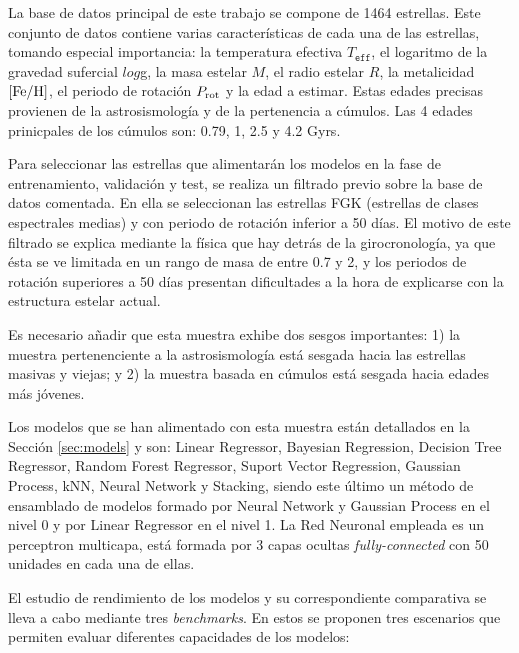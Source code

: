 \vspace{0.5cm}
La base de datos principal de este trabajo se compone de 1464 estrellas. Este conjunto de datos contiene varias características de cada una de las estrellas, tomando especial importancia: la temperatura efectiva $T_\texttt{eff}$, el logaritmo de la gravedad sufercial $log$g, la masa estelar $M$, el radio estelar $R$, la metalicidad ${\rm [Fe/H]}$, el periodo de rotación $P_{\rm rot}$ y la edad a estimar. Estas edades precisas provienen de la astrosismología y de la pertenencia a cúmulos. Las 4 edades prinicpales de los cúmulos son: 0.79, 1, 2.5 y 4.2 Gyrs.

Para seleccionar las estrellas que alimentarán los modelos en la fase de entrenamiento, validación y test, se realiza un filtrado previo sobre la base de datos comentada. En ella se seleccionan las estrellas FGK (estrellas de clases espectrales medias) y con periodo de rotación inferior a 50 días. El motivo de este filtrado se explica mediante la física que hay detrás de la girocronología, ya que ésta se ve limitada en un rango de masa de entre 0.7 y 2, y los periodos de rotación superiores a 50 días presentan dificultades a la hora de explicarse con la estructura estelar actual.

Es necesario añadir que esta muestra exhibe dos sesgos importantes: 1) la muestra pertenenciente a la astrosismología está sesgada hacia las estrellas masivas y viejas; y 2) la muestra basada en cúmulos está sesgada hacia edades más jóvenes.

\vspace{0.5cm}

Los modelos que se han alimentado con esta muestra están detallados en la Sección \ref{sec:models} y son: Linear Regressor, Bayesian Regression, Decision Tree Regressor, Random Forest Regressor, Suport Vector Regression, Gaussian Process, kNN, Neural Network y Stacking, siendo este último un método de ensamblado de modelos formado por Neural Network y Gaussian Process en el nivel 0 y por Linear Regressor en el nivel 1. La Red Neuronal empleada es un perceptron multicapa, está formada por 3 capas ocultas \emph{fully-connected} con 50 unidades en cada una de ellas.

El estudio de rendimiento de los modelos y su correspondiente comparativa se lleva a cabo mediante tres \emph{benchmarks}. En estos se proponen tres escenarios que permiten evaluar diferentes capacidades de los modelos:

